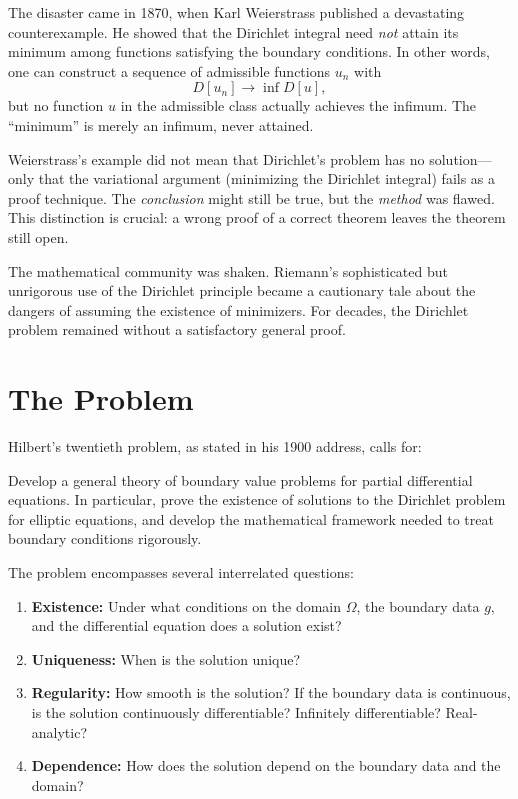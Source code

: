 The disaster came in 1870, when Karl Weierstrass published a devastating counterexample. He showed that the Dirichlet integral need \emph{not} attain its minimum among functions satisfying the boundary conditions. In other words, one can construct a sequence of admissible functions $u_n$ with
\[
    D[u_n] \to \inf D[u],
\]
but no function $u$ in the admissible class actually achieves the infimum. The ``minimum'' is merely an infimum, never attained.

Weierstrass's example did not mean that Dirichlet's problem has no solution---only that the variational argument (minimizing the Dirichlet integral) fails as a proof technique. The \emph{conclusion} might still be true, but the \emph{method} was flawed. This distinction is crucial: a wrong proof of a correct theorem leaves the theorem still open.

The mathematical community was shaken. Riemann's sophisticated but unrigorous use of the Dirichlet principle became a cautionary tale about the dangers of assuming the existence of minimizers. For decades, the Dirichlet problem remained without a satisfactory general proof.

\section{The Problem}

Hilbert's twentieth problem, as stated in his 1900 address, calls for:

\begin{problem_statement}
Develop a general theory of boundary value problems for partial differential equations. In particular, prove the existence of solutions to the Dirichlet problem for elliptic equations, and develop the mathematical framework needed to treat boundary conditions rigorously.
\end{problem_statement}

The problem encompasses several interrelated questions:
\begin{enumerate}
    \item \textbf{Existence:} Under what conditions on the domain $\Omega$, the boundary data $g$, and the differential equation does a solution exist?
    \item \textbf{Uniqueness:} When is the solution unique?
    \item \textbf{Regularity:} How smooth is the solution? If the boundary data is continuous, is the solution continuously differentiable? Infinitely differentiable? Real-analytic?
    \item \textbf{Dependence:} How does the solution depend on the boundary data and the domain?
\end{enumerate}

